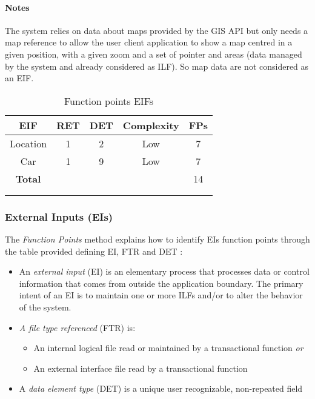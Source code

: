 \paragraph{Notes} The system relies on data about maps provided by the GIS API but only needs a map reference to allow the user client application to show a map centred in a given position, with a given zoom and a set of pointer and areas (data managed by the system and already considered as ILF). So map data are not considered as an EIF.

\begin{longtable}{ccccc}
\toprule
\textbf{EIF}			&	RET	&	DET	&	Complexity  & \textbf{FPs}\\
\midrule
Location			&	1	&	2		&	Low & 7 \\
Car & 1 & 9 & Low & 7 \\
\midrule
\textbf{Total} & & & & 14\\
\bottomrule \\
\caption{Function points EIFs}
\label{tbl:eifFP}
\end{longtable}

\clearpage

\subsubsection{External Inputs (EIs)}
\label{sec:EIs}

The \emph{Function Points} method explains how to identify EIs function points through the table provided defining EI, FTR and DET \cite{FP}:
\begin{itemize}
	\item An \emph{external input} (EI) is an elementary process that processes data or control information that comes from outside the application boundary. The primary intent of an EI is to maintain one or more ILFs and/or to alter the behavior of the system.
	\item \emph{A file type referenced} (FTR) is:
	\begin{itemize}
 		\item An internal logical file read or maintained by a transactional function \emph{or}
 		\item An external interface file read by a transactional function
	\end{itemize}
	\item A \emph{data element type} (DET) is a unique user recognizable, non-repeated field
\end{itemize} 

